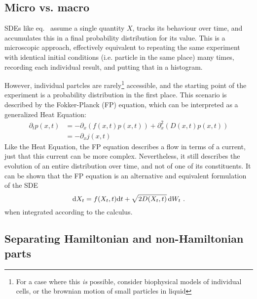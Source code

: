 \subsection{Micro vs. macro}

SDEs like eq.~ assume a single quantity \(X\), tracks its behaviour over time, and accumulates this in a final probability distribution for its value. This is a microscopic approach, effectively equivalent to repeating the same experiment with identical initial conditions (i.e. particle in the same place) many times, recording each individual result, and putting that in a histogram.

However, individual partcles are rarely\footnote{For a case where this \emph{is} possible, consider biophysical models of individual cells, or the brownian motion of small particles in liquid } accessible, and the starting point of the experiment is a probability distribution in the first place. This scenario is described by the Fokker-Planck (FP) equation, which can be interpreted as a generalized Heat Equation:
%
\begin{equation}
	\label{eqn:fp}
	\begin{split}
	\partial_tp(x,t)
	&= - \partial_x (f(x,t)p(x,t)) + \partial_x^2 (D(x,t)p(x,t)) \\
	&= -\partial_xj(x,t)
	\end{split}
\end{equation}
%
Like the Heat Equation, the FP equation describes a flow in terms of a current, just that this current can be more complex. Nevertheless, it still describes the evolution of an entire distribution over time, and not of one of its constituents. It can be shown that the FP equation is an alternative and equivalent formulation of the SDE
%
\begin{equation}
	\mathrm{d} X_t = f(X_t,t)\mathrm{d} t + \sqrt{2 D(X_t,t)}\,\mathrm{d} W_t ~.
\end{equation}
%
when integrated according to the \Ito{} calculus.















\subsection{Separating Hamiltonian and non-Hamiltonian parts}

